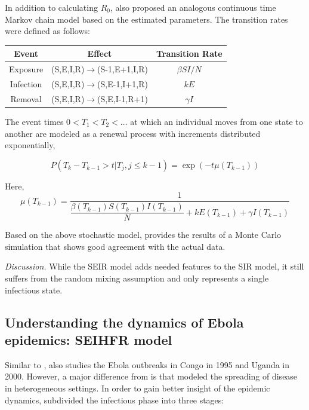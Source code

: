 \documentclass[10pt, journal,onecolumn]{IEEEtran}
\begin{document}
In addition to calculating $R_0$, \citep{chowell2004basic} also proposed an analogous continuous time Markov chain model based on the estimated parameters. The transition rates were defined as follows:

\begin{center}
\begin{tabular}{|c|c|c|}
\hline
Event & Effect & Transition Rate\tabularnewline
\hline
\hline
Exposure & (S,E,I,R)$\to$(S-1,E+1,I,R) & $\beta SI/N$\tabularnewline
\hline
Infection & (S,E,I,R)$\to$(S,E-1,I+1,R) & $kE$\tabularnewline
\hline
Removal & (S,E,I,R)$\to$(S,E,I-1,R+1) & $\gamma I$\tabularnewline
\hline
\end{tabular}
\end{center}

The event times $0<T_1<T_2<\ldots$ at which an individual moves from one state to another are modeled as a renewal process with increments distributed exponentially,

\begin{equation}
P(T_k-T_{k-1} > t | T_j, j\leq k-1) = \exp(-t \mu (T_{k-1}) )
\end{equation}

Here,
\[
\mu (T_{k-1}) = \frac{1}{\dfrac{\beta(T_{k-1}) S(T_{k-1}) I(T_{k-1})}{N} + k E(T_{k-1}) + \gamma I(T_{k-1})}
\]

Based on the above stochastic model, \citep{chowell2004basic} provides the results of a Monte Carlo
simulation that shows good agreement with the actual data.

\textit{Discussion.} While the SEIR model adds needed features to the SIR model, it still suffers
from the random mixing assumption and only represents a single infectious state.

\subsection{\textbf{Understanding the dynamics of Ebola epidemics: SEIHFR model \citep{legrand2007understanding}}}

Similar to \citep{chowell2004basic}, \citep{legrand2007understanding} also studies the Ebola
outbreaks in Congo in 1995 and Uganda in 2000. However, a major difference from
\citep{chowell2004basic} is that \citep{legrand2007understanding} modeled the spreading of disease
in heterogeneous settings. In order to gain better insight of the epidemic dynamics,
\citep{legrand2007understanding} subdivided the infectious phase into three stages:
\end{document}
